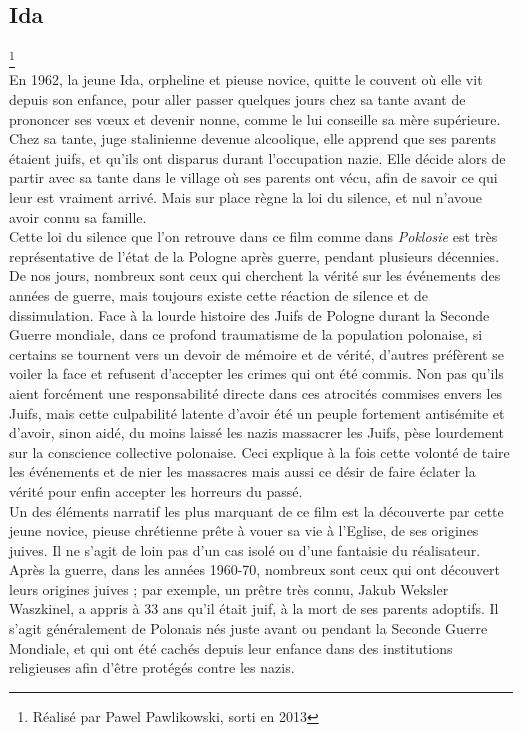 \documentclass[12pt]{amsart}
\begin{document}
\begin{multicols}{2}
\subsection*{Ida}\footnote{Réalisé par Pawel Pawlikowski, sorti en 2013}\\
En 1962, la jeune Ida, orpheline et pieuse novice, quitte le couvent où elle vit depuis son enfance, pour aller passer quelques jours chez sa tante avant de prononcer ses vœux et devenir nonne, comme le lui conseille sa mère supérieure. Chez sa tante, juge stalinienne devenue alcoolique, elle apprend que ses parents étaient juifs, et qu'ils ont disparus durant l’occupation nazie. Elle décide alors de partir avec sa tante dans le village où ses parents ont vécu, afin de savoir ce qui leur est vraiment arrivé. Mais sur place règne la loi du silence, et nul n’avoue avoir connu sa famille. \\
Cette loi du silence que l'on retrouve dans ce film comme dans \emph{Poklosie} est très représentative de l'état de la Pologne après guerre, pendant plusieurs décennies. De nos jours, nombreux sont ceux qui cherchent la vérité sur les événements des années de guerre, mais toujours existe cette réaction de silence et de dissimulation. Face à la lourde histoire des Juifs de Pologne durant la Seconde Guerre mondiale, dans ce profond traumatisme de la population polonaise, si certains se tournent vers un devoir de mémoire et de vérité, d'autres préfèrent se voiler la face et refusent d'accepter les crimes qui ont été commis. Non pas qu'ils aient forcément une responsabilité directe dans ces atrocités commises envers les Juifs, mais cette culpabilité latente d'avoir été un peuple fortement antisémite et d'avoir, sinon aidé, du moins laissé les nazis massacrer les Juifs, pèse lourdement sur la conscience collective polonaise. Ceci explique à la fois cette volonté de taire les événements et de nier les massacres mais aussi ce désir de faire éclater la vérité pour enfin accepter les horreurs du passé.\\
Un des éléments narratif les plus marquant de ce film est la découverte par cette jeune novice, pieuse chrétienne prête à vouer sa vie à l'Eglise, de ses origines juives. Il ne s'agit de loin pas d'un cas isolé ou d'une fantaisie du réalisateur. Après la guerre, dans les années 1960-70, nombreux sont ceux qui ont découvert leurs origines juives ; par exemple, un prêtre très connu, Jakub Weksler Waszkinel, a appris à 33 ans qu'il était juif, à la mort de ses parents adoptifs. Il s'agit généralement de Polonais nés juste avant ou pendant la Seconde Guerre Mondiale, et qui ont été cachés depuis leur enfance dans des institutions religieuses afin d'être protégés contre les nazis. \\


\end{multicols}
\end{document}
